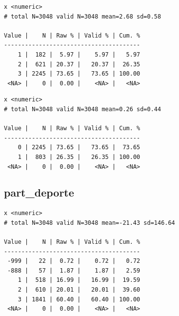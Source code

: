 \documentclass[
  letterpaper,
  DIV=11,
  numbers=noendperiod]{scrreprt}
\newenvironment{Shaded}{\begin{snugshade}}{\end{snugshade}}
\newcommand{\FunctionTok}[1]{\textcolor[rgb]{0.28,0.35,0.67}{#1}}
\newcommand{\NormalTok}[1]{\textcolor[rgb]{0.00,0.23,0.31}{#1}}
\newcommand{\SpecialCharTok}[1]{\textcolor[rgb]{0.37,0.37,0.37}{#1}}
\begin{document}
\begin{verbatim}
x <numeric> 
# total N=3048 valid N=3048 mean=2.68 sd=0.58

Value |    N | Raw % | Valid % | Cum. %
---------------------------------------
    1 |  182 |  5.97 |    5.97 |   5.97
    2 |  621 | 20.37 |   20.37 |  26.35
    3 | 2245 | 73.65 |   73.65 | 100.00
 <NA> |    0 |  0.00 |    <NA> |   <NA>
\end{verbatim}

\begin{Shaded}
\end{Shaded}

\begin{verbatim}
x <numeric> 
# total N=3048 valid N=3048 mean=0.26 sd=0.44

Value |    N | Raw % | Valid % | Cum. %
---------------------------------------
    0 | 2245 | 73.65 |   73.65 |  73.65
    1 |  803 | 26.35 |   26.35 | 100.00
 <NA> |    0 |  0.00 |    <NA> |   <NA>
\end{verbatim}

\hypertarget{part_deporte}{%
\subsection{part\_deporte}\label{part_deporte}}

\begin{Shaded}
\end{Shaded}

\begin{verbatim}
x <numeric> 
# total N=3048 valid N=3048 mean=-21.43 sd=146.64

Value |    N | Raw % | Valid % | Cum. %
---------------------------------------
 -999 |   22 |  0.72 |    0.72 |   0.72
 -888 |   57 |  1.87 |    1.87 |   2.59
    1 |  518 | 16.99 |   16.99 |  19.59
    2 |  610 | 20.01 |   20.01 |  39.60
    3 | 1841 | 60.40 |   60.40 | 100.00
 <NA> |    0 |  0.00 |    <NA> |   <NA>
\end{verbatim}
\end{document}
